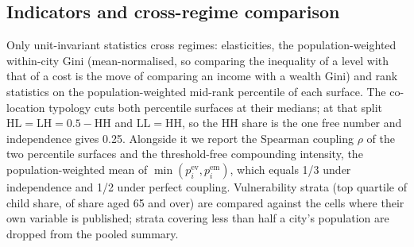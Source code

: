 \documentclass[9pt,twocolumn]{article}
\begin{document}
\subsection*{Indicators and cross-regime comparison}
Only unit-invariant statistics cross regimes: elasticities, the
population-weighted within-city Gini (mean-normalised, so comparing the
inequality of a level with that of a cost is the move of comparing an
income with a wealth Gini) and rank statistics on the population-weighted
mid-rank percentile of each surface. The co-location typology cuts both
percentile surfaces at their medians; at that split
$\mathrm{HL} = \mathrm{LH} = 0.5 - \mathrm{HH}$ and
$\mathrm{LL} = \mathrm{HH}$, so the HH share is the one free number and
independence gives 0.25. Alongside it we report the Spearman coupling
$\rho$ of the two percentile surfaces and the threshold-free compounding
intensity, the population-weighted mean of $\min(p^{\mathrm{ev}}_i,
p^{\mathrm{em}}_i)$, which equals 1/3 under independence and 1/2 under
perfect coupling. Vulnerability strata (top quartile of child share, of
share aged 65 and over) are compared against the cells where their own
variable is published; strata covering less than half a city's population
are dropped from the pooled summary.
\end{document}
